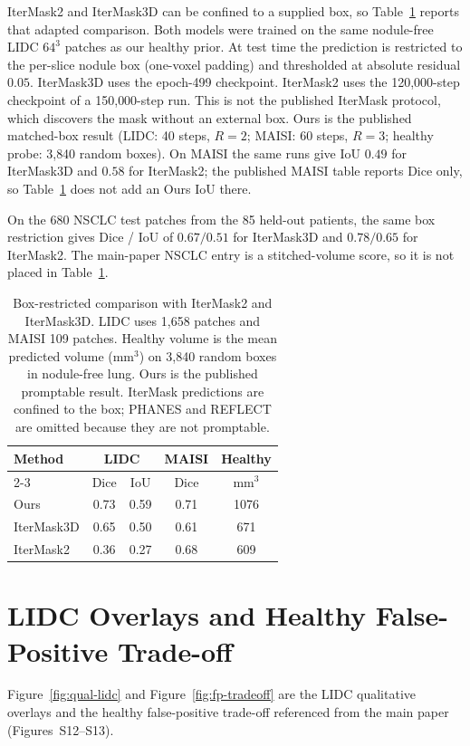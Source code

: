 \documentclass[twoside]{article}
\begin{document}
IterMask2 and IterMask3D can be confined to a supplied box, so
Table~\ref{tab:unprompted} reports that adapted comparison.
Both models were trained on the same nodule-free LIDC \(64^{3}\) patches
as our healthy prior.
At test time the prediction is restricted to the per-slice nodule box
(one-voxel padding) and thresholded at absolute residual \(0.05\).
IterMask3D uses the epoch-499 checkpoint.
IterMask2 uses the 120{,}000-step checkpoint of a 150{,}000-step run.
This is not the published IterMask protocol, which discovers the mask
without an external box.
Ours is the published matched-box result (LIDC: 40 steps, \(R{=}2\);
MAISI: 60 steps, \(R{=}3\); healthy probe: 3{,}840 random boxes).
On MAISI the same runs give IoU \(0.49\) for IterMask3D and \(0.58\) for
IterMask2; the published MAISI table reports Dice only, so
Table~\ref{tab:unprompted} does not add an Ours IoU there.

On the 680 NSCLC test patches from the 85 held-out patients, the same
box restriction gives Dice / IoU of \(0.67 / 0.51\) for IterMask3D and
\(0.78 / 0.65\) for IterMask2.
The main-paper NSCLC entry is a stitched-volume score, so it is not
placed in Table~\ref{tab:unprompted}.

\begin{table}[t]
  \centering
  \caption{Box-restricted comparison with IterMask2 and IterMask3D.
  LIDC uses 1{,}658 patches and MAISI 109 patches.
  Healthy volume is the mean predicted volume (mm\(^{3}\)) on 3{,}840
  random boxes in nodule-free lung.
  Ours is the published promptable result.
  IterMask predictions are confined to the box; PHANES and REFLECT are
  omitted because they are not promptable.}
  \label{tab:unprompted}
  \small
  \setlength{\tabcolsep}{4pt}
  \begin{tabular}{lcccc}
    \toprule
    Method &
    \multicolumn{2}{c}{LIDC} &
    MAISI &
    Healthy \\
    \cmidrule(lr){2-3}
    & Dice & IoU & Dice & mm\(^{3}\) \\
    \midrule
    Ours & 0.73 & 0.59 & 0.71 & 1076 \\
    IterMask3D & 0.65 & 0.50 & 0.61 & 671 \\
    IterMask2 & 0.36 & 0.27 & 0.68 & 609 \\
    \bottomrule
  \end{tabular}
\end{table}

\section{LIDC Overlays and Healthy False-Positive Trade-off}
\label{sec:supp:lidc-figs}
Figure~\ref{fig:qual-lidc} and Figure~\ref{fig:fp-tradeoff} are the
LIDC qualitative overlays and the healthy false-positive trade-off
referenced from the main paper (Figures~S12--S13).
\end{document}
